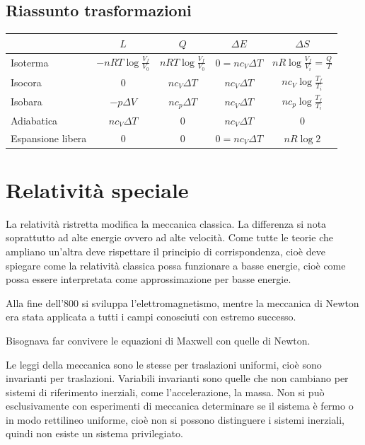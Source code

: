 \section{Riassunto trasformazioni}
\begin{center}
\begin{tabular}{p{2cm}|cccc}
&$L$&$Q$&$\Delta E$&$\Delta S$\\
\hline
Isoterma&$-nRT\log\frac{V_f}{V_0}$&$nRT\log\frac{V_f}{V_0}$&$0=nc_V\Delta T$&$nR\log\frac{V_f}{V_i}=\frac{Q}{T}$\\
Isocora&$0$&$nc_V\Delta T$&$nc_V\Delta T$&$nc_V\log\frac{T_f}{T_i}$\\
Isobara&$-p\Delta V$&$nc_p\Delta T$&$nc_V\Delta T$&$nc_p\log\frac{T_f}{T_i}$\\
Adiabatica&$nc_V\Delta T$&$0$&$nc_V\Delta T$&$0$\\
Espansione libera&$0$&$0$&$0=nc_V\Delta T$&$nR\log 2$\\
\end{tabular}
\end{center}


\chapter{Relatività speciale}
La relatività ristretta modifica la meccanica classica. La differenza si nota soprattutto ad alte energie ovvero ad alte velocità. Come tutte le teorie che ampliano un'altra deve rispettare il principio di corrispondenza, cioè deve spiegare come la relatività classica possa funzionare a basse energie, cioè come possa essere interpretata come approssimazione per basse energie.

Alla fine dell'800 si sviluppa l'elettromagnetismo, mentre la meccanica di Newton era stata applicata a tutti i campi conosciuti con estremo successo.

Bisognava far convivere le equazioni di Maxwell con quelle di Newton.

Le leggi della meccanica sono le stesse per traslazioni uniformi, cioè sono invarianti per traslazioni. Variabili invarianti sono quelle che non cambiano per sistemi di riferimento inerziali, come l'accelerazione, la massa. Non si può esclusivamente con esperimenti di meccanica determinare se il sistema è fermo o in modo rettilineo uniforme, cioè non si possono distinguere i sistemi inerziali, quindi non esiste un sistema privilegiato.


